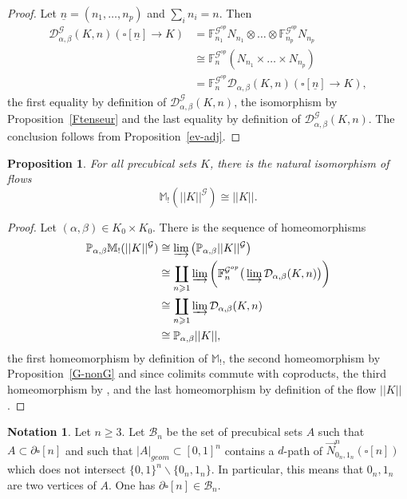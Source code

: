 \documentclass[a4paper,12pt]{amsart}
\newcommand{\D}{\mathcal{D}}
\newcommand{\de}{\partial}
\newcommand{\p}{\times}
\renewcommand{\vec}{\overrightarrow}
\renewcommand{\P}{\mathbb{P}}
\newtheorem{prop}[thm]{Proposition}
\newcommand{\bp}{\begin{prop}}
\newcommand{\ep}{\end{prop}}
\newcommand{\bpf}{\begin{proof}}
\newcommand{\epf}{\end{proof}}
\theoremstyle{definition}
\newtheorem{nota}[thm]{Notation}
\newcommand{\iso}{\cong}
\newcommand{\ot}{\otimes}
\renewcommand{\geq}{\geqslant}
\newcommand{\lmoore}{\mathbb{M}_!}
\newcommand{\liminj}{\varinjlim}
\renewcommand{\P}{\mathbb{P}}
\begin{document}
\bpf Let $\underline{n} = (n_1,\dots,n_p)$ and $\sum_i n_i=n$. Then 
\begin{align*}
	\D_{\alpha,\beta}^{\mathcal{G}}(K,n)(\square[\underline{n}]\to K) &= \mathbb{F}^{\mathcal{G}^{op}}_{n_1} N_{n_1} \ot \dots \ot \mathbb{F}^{\mathcal{G}^{op}}_{n_p} N_{n_p}\\
	&\iso \mathbb{F}^{\mathcal{G}^{op}}_{n}(N_{n_1}\p\dots \p N_{n_p}) \\
	&=\mathbb{F}^{\mathcal{G}^{op}}_{n}\D_{\alpha,\beta}(K,n)(\square[\underline{n}]\to K),
\end{align*}
the first equality by definition of $\D_{\alpha,\beta}^{\mathcal{G}}(K,n)$, the isomorphism by Proposition~\ref{Ftenseur} and the last equality by definition of $\D_{\alpha,\beta}^{\mathcal{G}}(K,n)$. The conclusion follows from Proposition~\ref{ev-adj}.
\epf


\bp \label{cp3}
For all precubical sets $K$, there is the natural isomorphism of flows \[\lmoore(||K||^{\mathcal{G}}) \iso ||K||.\]
\ep

\bpf
Let $(\alpha,\beta)\in K_0\p K_0$. There is the sequence of homeomorphisms 
\begin{align*}
	\P_{\alpha,\beta}\lmoore(||K||^{\mathcal{G}})
	&\iso \liminj \big(\P_{\alpha,\beta} ||K||^{\mathcal{G}}\big)\\
	& \iso \coprod_{n\geq 1}\liminj \bigg(\mathbb{F}^{\mathcal{G}^{op}}_{n}\big(\liminj \D_{\alpha,\beta}(K,n)\big)\bigg) \\
	& \iso \coprod_{n\geq 1} \liminj \D_{\alpha,\beta}(K,n)\\
	&\iso \P_{\alpha,\beta} ||K||,
\end{align*}
the first homeomorphism by definition of $\lmoore$, the second homeomorphism by Proposition~\ref{G-nonG} and since colimits commute with coproducts, the third homeomorphism by \cite[Proposition~5.8]{dgrtop}, and the last homeomorphism by definition of the flow $||K||$.
\epf


\begin{nota} \cite[Notation~A.1]{NaturalRealization}
	Let $n\geq 3$. Let $\mathcal{B}_n$ be the set of precubical sets $A$ such that $A\subset \de\square[n]$ and such that $|A|_{geom} \subset [0,1]^n$ contains a $d$-path of $\vec{N}^n_{0_n,1_n}(\square[n])$ which does not intersect $\{0,1\}^n\backslash\{0_n,1_n\}$. In particular, this means that $0_n,1_n$ are two vertices of $A$. One has $\de\square[n]\in \mathcal{B}_n$.
\end{nota}
\end{document}
